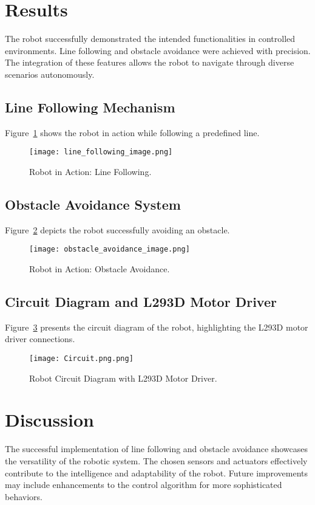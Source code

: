 \documentclass[conference]{IEEEtran}
\begin{document}
\section{Results}
The robot successfully demonstrated the intended functionalities in controlled environments. Line following and obstacle avoidance were achieved with precision. The integration of these features allows the robot to navigate through diverse scenarios autonomously.

\subsection{Line Following Mechanism}
Figure~\ref{fig:line_following_image} shows the robot in action while following a predefined line.

\begin{figure}[H]
    \centering
    \texttt{[image: line\_following\_image.png]}
    \caption{Robot in Action: Line Following.}
    \label{fig:line_following_image}
\end{figure}

\subsection{Obstacle Avoidance System}
Figure~\ref{fig:obstacle_avoidance_image} depicts the robot successfully avoiding an obstacle.

\begin{figure}[H]
    \centering
    \texttt{[image: obstacle\_avoidance\_image.png]}
    \caption{Robot in Action: Obstacle Avoidance.}
    \label{fig:obstacle_avoidance_image}
\end{figure}

\subsection{Circuit Diagram and L293D Motor Driver}
Figure~\ref{fig:circuit_diagram} presents the circuit diagram of the robot, highlighting the L293D motor driver connections.

\begin{figure}[H]
    \centering
    \texttt{[image: Circuit.png.png]}
    \caption{Robot Circuit Diagram with L293D Motor Driver.}
    \label{fig:circuit_diagram}
\end{figure}

\section{Discussion}
The successful implementation of line following and obstacle avoidance showcases the versatility of the robotic system. The chosen sensors and actuators effectively contribute to the intelligence and adaptability of the robot. Future improvements may include enhancements to the control algorithm for more sophisticated behaviors.
\end{document}
